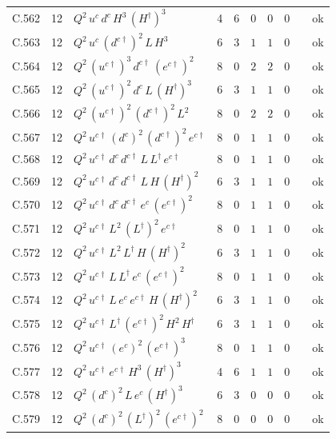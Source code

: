 {\begin{longtable}{@{}ll>{\raggedright\arraybackslash}p{6.4cm}rrllllr@{}}
C.562 & 12 & $Q^{2}\,u^c\,d^c\,H^{3}\,(H^\dagger)^{3}$ & 4 & 6 & $0$ & $0$ & $0$ &  & ok \\
C.563 & 12 & $Q^{2}\,u^c\,(d^{c\dagger})^{2}\,L\,H^{3}$ & 6 & 3 & $1$ & $1$ & $0$ &  & ok \\
C.564 & 12 & $Q^{2}\,(u^{c\dagger})^{3}\,d^{c\dagger}\,(e^{c\dagger})^{2}$ & 8 & 0 & $2$ & $2$ & $0$ &  & ok \\
C.565 & 12 & $Q^{2}\,(u^{c\dagger})^{2}\,d^c\,L\,(H^\dagger)^{3}$ & 6 & 3 & $1$ & $1$ & $0$ &  & ok \\
C.566 & 12 & $Q^{2}\,(u^{c\dagger})^{2}\,(d^{c\dagger})^{2}\,L^{2}$ & 8 & 0 & $2$ & $2$ & $0$ &  & ok \\
C.567 & 12 & $Q^{2}\,u^{c\dagger}\,(d^c)^{2}\,(d^{c\dagger})^{2}\,e^{c\dagger}$ & 8 & 0 & $1$ & $1$ & $0$ &  & ok \\
C.568 & 12 & $Q^{2}\,u^{c\dagger}\,d^c\,d^{c\dagger}\,L\,L^\dagger\,e^{c\dagger}$ & 8 & 0 & $1$ & $1$ & $0$ &  & ok \\
C.569 & 12 & $Q^{2}\,u^{c\dagger}\,d^c\,d^{c\dagger}\,L\,H\,(H^\dagger)^{2}$ & 6 & 3 & $1$ & $1$ & $0$ &  & ok \\
C.570 & 12 & $Q^{2}\,u^{c\dagger}\,d^c\,d^{c\dagger}\,e^c\,(e^{c\dagger})^{2}$ & 8 & 0 & $1$ & $1$ & $0$ &  & ok \\
C.571 & 12 & $Q^{2}\,u^{c\dagger}\,L^{2}\,(L^\dagger)^{2}\,e^{c\dagger}$ & 8 & 0 & $1$ & $1$ & $0$ &  & ok \\
C.572 & 12 & $Q^{2}\,u^{c\dagger}\,L^{2}\,L^\dagger\,H\,(H^\dagger)^{2}$ & 6 & 3 & $1$ & $1$ & $0$ &  & ok \\
C.573 & 12 & $Q^{2}\,u^{c\dagger}\,L\,L^\dagger\,e^c\,(e^{c\dagger})^{2}$ & 8 & 0 & $1$ & $1$ & $0$ &  & ok \\
C.574 & 12 & $Q^{2}\,u^{c\dagger}\,L\,e^c\,e^{c\dagger}\,H\,(H^\dagger)^{2}$ & 6 & 3 & $1$ & $1$ & $0$ &  & ok \\
C.575 & 12 & $Q^{2}\,u^{c\dagger}\,L^\dagger\,(e^{c\dagger})^{2}\,H^{2}\,H^\dagger$ & 6 & 3 & $1$ & $1$ & $0$ &  & ok \\
C.576 & 12 & $Q^{2}\,u^{c\dagger}\,(e^c)^{2}\,(e^{c\dagger})^{3}$ & 8 & 0 & $1$ & $1$ & $0$ &  & ok \\
C.577 & 12 & $Q^{2}\,u^{c\dagger}\,e^{c\dagger}\,H^{3}\,(H^\dagger)^{3}$ & 4 & 6 & $1$ & $1$ & $0$ &  & ok \\
C.578 & 12 & $Q^{2}\,(d^c)^{2}\,L\,e^c\,(H^\dagger)^{3}$ & 6 & 3 & $0$ & $0$ & $0$ &  & ok \\
C.579 & 12 & $Q^{2}\,(d^c)^{2}\,(L^\dagger)^{2}\,(e^{c\dagger})^{2}$ & 8 & 0 & $0$ & $0$ & $0$ &  & ok \\

\end{longtable}}
